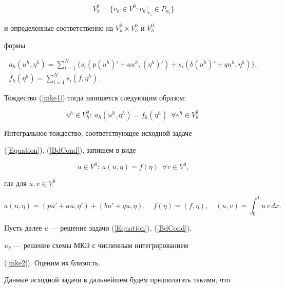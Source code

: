 $$


V_h^0= \{ v_h\in V^0: v_h |_{e_i}\in P_{n_i} \}


$$


и определенные соответственно на $V_h^0\times V_h^0$ и $V_h^0$


формы


\begin{gather*}


a_h(u^h,\eta^h)=\sum_{i=1}^N \{ s_i(p(u^h)'+au^h,(\eta^h)')


+s_i(b(u^h)'+qu^h,\eta^h) \}, \\


%


f_h(\eta^h)=\sum_{i=1}^N {s_i(f,\eta^h) }.


\end{gather*}


Тождество (\ref{mke1}) тогда запишется следующим образом:


\begin{equation} \label{mke2}


u^h\in V_h^0:\ a_h(u^h,\eta^h) =f_h(\eta^h)\ \; \forall v^h\in V_h^0.


\end{equation}


Интегральное тождество, соответствующее исходной задаче


(\ref{Equation}), (\ref{BdCond}), запишем в виде


\begin{equation} \label{it}


u\in V^0:\ a(u,\eta) =f(\eta)\ \; \forall v\in V^0,


\end{equation}


где для $u, v\in V^0$


$$


a(u,\eta)=(pu'+au, \eta')+(bu'+qu, \eta), \quad f(\eta)=(f,\eta),\quad


(u,v)= \int_{0}^1 u\, v\,dx.


$$


Пусть далее $u$ --- решение задачи (\ref{Equation}), (\ref{BdCond}),


$u_h$ --- решение схемы МКЭ с численным интегрированием


(\ref{mke2}). Оценим их близость.





Данные исходной задачи в дальнейшем будем предполагать такими, что


